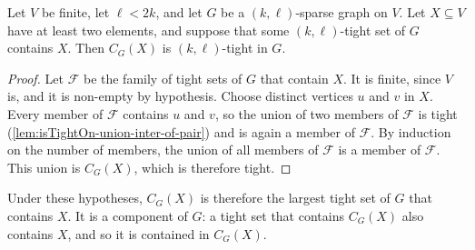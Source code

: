 \begin{lemma}
  \label{lem:isSparse-maxBlock-isTightOn}
  \leanok
  Let $V$ be finite, let $\ell < 2k$, and let $G$ be a
  $(k, \ell)$-sparse graph on $V$. Let $X \subseteq V$ have at least
  two elements, and suppose that some $(k, \ell)$-tight set of $G$
  contains $X$. Then $C_G(X)$ is $(k, \ell)$-tight in $G$.
\end{lemma}
\begin{proof}
  \leanok
  Let $\mathcal{F}$ be the family of tight sets of $G$ that contain
  $X$. It is finite, since $V$ is, and it is non-empty by hypothesis.
  Choose distinct vertices $u$ and $v$ in $X$. Every member of
  $\mathcal{F}$ contains $u$ and $v$, so the union of two members of
  $\mathcal{F}$ is tight (\cref{lem:isTightOn-union-inter-of-pair}) and
  is again a member of $\mathcal{F}$. By induction on the number of
  members, the union of all members of $\mathcal{F}$ is a member of
  $\mathcal{F}$. This union is $C_G(X)$, which is therefore tight.
\end{proof}

Under these hypotheses, $C_G(X)$ is therefore the largest tight set of
$G$ that contains $X$. It is a
component of $G$: a tight set that contains $C_G(X)$ also contains $X$,
and so it is contained in $C_G(X)$.

